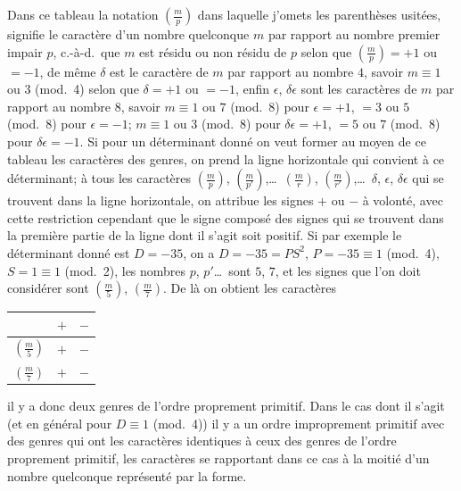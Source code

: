 \documentclass[11pt,a4paper]{article}
\begin{document}
Dans ce tableau la notation $\left(\frac{m}{p}\right)$ dans laquelle j'omets les parenth\`{e}ses usit\'{e}es, signifie le caract\`{e}re d'un nombre quelconque $m$ par rapport au nombre premier impair $p$, c.-\`{a}-d.\ que $m$ est r\'{e}sidu ou non r\'{e}sidu de $p$ selon que $\left(\frac{m}{p}\right) = +1$ ou $=-1$, de m\^{e}me $\delta$ est le caract\`{e}re de $m$ par rapport au nombre $4$, savoir $m \equiv 1$ ou $3$ (mod.\ 4) selon que $\delta = +1$ ou $=-1$, enfin $\epsilon$, $\delta\epsilon$ sont les caract\`{e}res de $m$ par rapport au nombre $8$, savoir $m \equiv 1$ ou $7$ (mod.\ 8) pour $\epsilon = +1$, $=3$ ou $5$ (mod.\ 8) pour $\epsilon = -1$; $m \equiv 1$ ou $3$ (mod.\ 8) pour $\delta\epsilon = +1$, $=5$ ou $7$ (mod.\ 8) pour $\delta\epsilon = -1$. Si pour un d\'{e}terminant donn\'{e} on veut former au moyen de ce tableau les caract\`{e}res des genres, on prend la ligne horizontale qui convient \`{a} ce d\'{e}terminant; \`{a} tous les caract\`{e}res $\left(\frac{m}{p}\right)$, $\left(\frac{m}{p'}\right)$,\ldots\ $\left(\frac{m}{r}\right)$, $\left(\frac{m}{r'}\right)$,\ldots\ $\delta$, $\epsilon$, $\delta\epsilon$ qui se trouvent dans la ligne horizontale, on attribue les signes $+$ ou $-$ \`{a} volont\'{e}, avec cette restriction cependant que le signe compos\'{e} des signes qui se trouvent dans la premi\`{e}re partie de la ligne dont il s'agit soit positif. Si par exemple le d\'{e}terminant donn\'{e} est $D = -35$, on a $D = -35 = PS^2$, $P = -35 \equiv 1$ (mod.\ 4), $S=1 \equiv 1$ (mod.\ 2), les nombres $p$, $p'$\ldots\ sont $5$, $7$, et les signes que l'on doit consid\'{e}rer sont $\left(\frac{m}{5}\right)$, $\left(\frac{m}{7}\right)$. De l\`{a} on obtient les caract\`{e}res

\begin{center}
\begin{tabular}{c|cc}
 & $+$ & $-$ \\
\hline
$\left(\frac{m}{5}\right)$ & $+$ & $-$ \\
$\left(\frac{m}{7}\right)$ & $+$ & $-$
\end{tabular}
\end{center}

il y a donc deux genres de l'ordre proprement primitif. Dans le cas dont il s'agit (et en g\'{e}n\'{e}ral pour $D \equiv 1$ (mod.\ 4)) il y a un ordre improprement primitif avec des genres qui ont les caract\`{e}res identiques \`{a} ceux des genres de l'ordre proprement primitif, les caract\`{e}res se rapportant dans ce cas \`{a} la moiti\'{e} d'un nombre quelconque repr\'{e}sent\'{e} par la forme.
\end{document}
